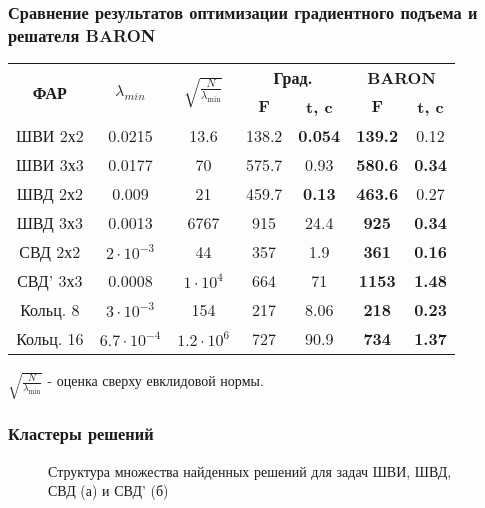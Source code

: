 \begin{frame}
    \frametitle{Сравнение результатов оптимизации градиентного подъема и решателя BARON}
    \begin{table}
\centering
\begin{tabular}{|c|c|c|c c|c c|}
    \hline
    \multirow{2}{*}{\textbf{ФАР}} & \multirow{2}{*}{$\lambda_{min}$} & \multirow{2}{*}{$\sqrt{\frac{N}{\lambda_{\min}}}$} & \multicolumn{2}{c}{\textbf{Град.}} & \multicolumn{2}{|c|}{\textbf{BARON}}\\
    & & & \textbf{$\textbf{F}$} & \textbf{t, c} & \textbf{$\textbf{F}$} & \textbf{t, c} \\
    \hline
    ШВИ 2х2 & 0.0215 & 13.6 & 138.2 & \textbf{0.054} & \textbf{139.2} & 0.12 \\
    ШВИ 3х3 & 0.0177 & 70 & 575.7 & 0.93 & \textbf{580.6} & \textbf{0.34} \\
    ШВД 2х2 & 0.009 & 21 & 459.7 & \textbf{0.13} & \textbf{463.6} & 0.27 \\
    ШВД 3х3 & 0.0013 & 6767 & 915 & 24.4 & \textbf{925} & \textbf{0.34}  \\
    СВД 2х2 & $2\cdot10^{-3}$ & 44& 357 & 1.9 & \textbf{361} & \textbf{0.16} \\
    СВД' 3х3 & 0.0008 & $1\cdot10^4$& 664 & 71 & \textbf{1153} & \textbf{1.48} \\
    Кольц. 8 & $3\cdot10^{-3}$ & 154 & 217 & 8.06 & \textbf{218} & \textbf{0.23} \\
    Кольц. 16 & $6.7\cdot10^{-4}$ & $1.2\cdot10^{6}$& 727 & 90.9 & \textbf{734} & \textbf{1.37} \\
    \hline
\end{tabular}
\label{tab:results}
\end{table}

$\sqrt{\frac{N}{\lambda_{\min}}}$ - оценка сверху евклидовой нормы.
\end{frame}

\begin{frame}
    \frametitle{Кластеры решений}

    \begin{figure}
    \centering
        \begin{minipage}[h]{0.6\linewidth}
        \end{minipage}
        \begin{minipage}[h]{0.6\linewidth}
        \end{minipage}
        \vspace{0.7em}
        \caption{Структура множества найденных решений для задач ШВИ, ШВД, СВД (а) и СВД' (б)}
        \label{ris:fit_dist}
    \end{figure}

\end{frame}

